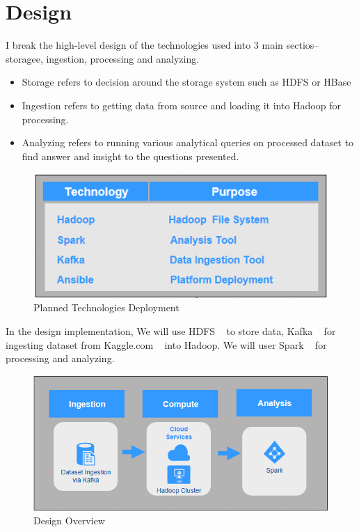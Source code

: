\documentclass[9pt,twocolumn,twoside]{../../styles/osajnl}
\begin{document}
\section{Design}

I break the high-level design of the technologies used into 3 main sectios-- storagee, ingestion, processing and analyzing. 

\begin{itemize}
  \item Storage refers to decision around the storage system such as HDFS or HBase
  \item Ingestion refers to getting data from source and loading it into Hadoop for processing.
  \item Analyzing refers to running various analytical queries on processed dataset to find answer and insight to the questions presented. 
\end{itemize}


\begin{figure}[H]
 \centering
\includegraphics[scale=0.6]{images/image10}
\caption{Planned Technologies Deployment ~\cite{wiki-ansible} ~\cite{www-kafka} ~\cite{www-spark} ~\cite{wiki-hadoop}}
\end{figure}


In the design implementation, We will use HDFS ~\cite{wiki-hadoop}
 to store data, Kafka  ~\cite{www-kafka} for ingesting dataset from Kaggle.com ~\cite{www-kaggle} into Hadoop.  We will user Spark  ~\cite{www-spark} for processing and analyzing. 

\begin{figure}[H]
 \centering
\includegraphics[scale=0.5]{images/image9}
\caption{Design Overview  ~\cite{www-kafka} ~\cite{www-spark} ~\cite{wiki-hadoop}}
\end{figure}
\end{document}
